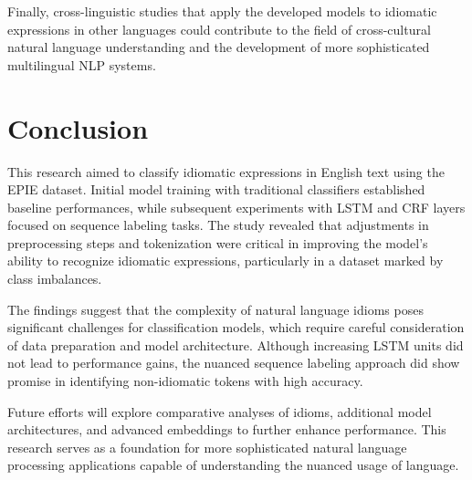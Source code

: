 \documentclass[conference]{IEEEtran}
\begin{document}
Finally, cross-linguistic studies that apply the developed models to idiomatic expressions in other languages could contribute to the field of cross-cultural natural language understanding and the development of more sophisticated multilingual NLP systems.

\section{Conclusion}

This research aimed to classify idiomatic expressions in English text using the EPIE dataset. Initial model training with traditional classifiers established baseline performances, while subsequent experiments with LSTM and CRF layers focused on sequence labeling tasks. The study revealed that adjustments in preprocessing steps and tokenization were critical in improving the model's ability to recognize idiomatic expressions, particularly in a dataset marked by class imbalances.

The findings suggest that the complexity of natural language idioms poses significant challenges for classification models, which require careful consideration of data preparation and model architecture. Although increasing LSTM units did not lead to performance gains, the nuanced sequence labeling approach did show promise in identifying non-idiomatic tokens with high accuracy.

Future efforts will explore comparative analyses of idioms, additional model architectures, and advanced embeddings to further enhance performance. This research serves as a foundation for more sophisticated natural language processing applications capable of understanding the nuanced usage of language.


	
	
\end{document}
